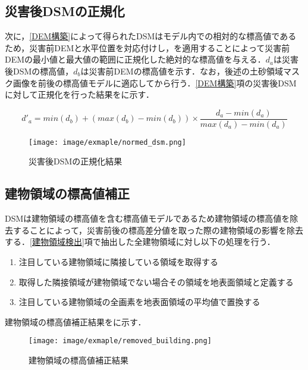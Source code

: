    \subsection{災害後DSMの正規化}
      \label{災害後DSMの正規化}
      次に，\ref{DEM構築}によって得られたDSMはモデル内での相対的な標高値であるため，災害前DEMと水平位置を対応付けし，を適用することによって災害前DEMの最小値と最大値の範囲に正規化した絶対的な標高値を与える．$d_{a}$は災害後DSMの標高値，$d_{b}$は災害前DEMの標高値を示す．なお，後述の土砂領域マスク画像を前後の標高値モデルに適応してから行う．\ref{DEM構築}項の災害後DSMに対して正規化を行った結果をに示す．

      \begin{equation}
        \label{正規化}
        d'_{a} =  
          min(d_{b}) + (max(d_{b}) - min(d_{b})) \times
          \dfrac{d_{a} - min(d_{a})} {max(d_{a}) - min(d_{a})}
      \end{equation}

      \begin{figure}[t]
        \centering
        \texttt{[image: image/exmaple/normed\_dsm.png]}
        \caption{災害後DSMの正規化結果}
        \label{正規化結果}
      \end{figure}


    \subsection{建物領域の標高値補正}
      DSMは建物領域の標高値を含む標高値モデルであるため建物領域の標高値を除去することによって，災害前後の標高差分値を取った際の建物領域の影響を除去する．\ref{建物領域検出}項で抽出した全建物領域に対し以下の処理を行う．

      \begin{enumerate}
        \setlength{\itemsep}{-5pt}
        \item 注目している建物領域に隣接している領域を取得する
        \item 取得した隣接領域が建物領域でない場合その領域を地表面領域と定義する
        \item 注目している建物領域の全画素を地表面領域の平均値で置換する
      \end{enumerate}

      建物領域の標高値補正結果をに示す．

      \begin{figure}[t]
        \centering
        \texttt{[image: image/exmaple/removed\_building.png]}
        \caption{建物領域の標高値補正結果}
        \label{建物領域の標高値補正結果}
      \end{figure}



